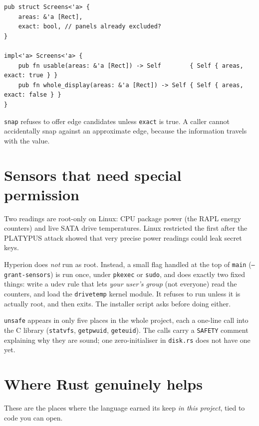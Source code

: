 \documentclass[11pt,a4paper]{article}
\newcommand{\code}[1]{\texttt{#1}}
\newcommand{\file}[1]{\texttt{#1}}
\begin{document}
\begin{lstlisting}[caption={\file{placement.rs} (trimmed).}]
pub struct Screens<'a> {
    areas: &'a [Rect],
    exact: bool, // panels already excluded?
}

impl<'a> Screens<'a> {
    pub fn usable(areas: &'a [Rect]) -> Self        { Self { areas, exact: true } }
    pub fn whole_display(areas: &'a [Rect]) -> Self { Self { areas, exact: false } }
}
\end{lstlisting}

\code{snap} refuses to offer edge candidates unless \code{exact} is true. A caller cannot
accidentally snap against an approximate edge, because the information travels with the value.

\section{Sensors that need special permission}

Two readings are root-only on Linux: CPU package power (the RAPL energy counters) and live
SATA drive temperatures. Linux restricted the first after the PLATYPUS attack showed that very
precise power readings could leak secret keys.

Hyperion does \emph{not} run as root. Instead, a small flag handled at the top of
\code{main} (\code{--grant-sensors}) is run once, under \code{pkexec} or \code{sudo}, and does
exactly two fixed things: write a udev rule that lets \emph{your user's group} (not everyone)
read the counters, and load the \code{drivetemp} kernel module. It refuses to run unless it is
actually root, and then exits. The installer script asks before doing either.

\code{unsafe} appears in only five places in the whole project, each a one-line call into the C
library (\code{statvfs}, \code{getpwuid}, \code{geteuid}). The calls carry a \code{SAFETY}
comment explaining why they are sound; one zero-initialiser in \file{disk.rs} does not have one
yet.

\section{Where Rust genuinely helps}

These are the places where the language earned its keep \emph{in this project}, tied to code
you can open.
\end{document}
